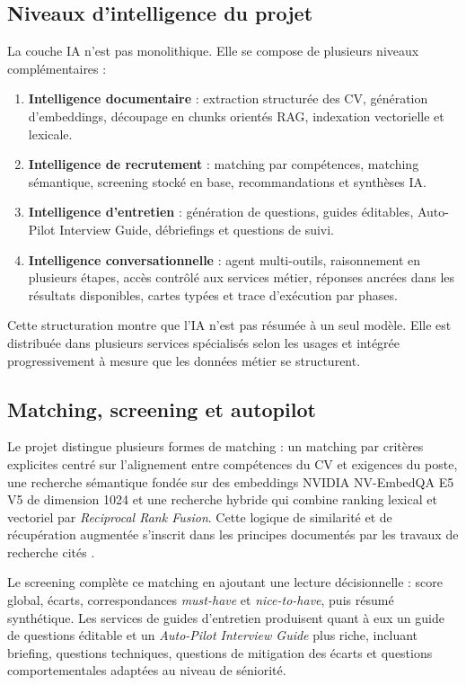 \subsection{Niveaux d'intelligence du projet}
La couche IA n'est pas monolithique. Elle se compose de plusieurs niveaux complémentaires :
\begin{enumerate}
  \item \textbf{Intelligence documentaire} : extraction structurée des CV, génération d'embeddings, découpage en chunks orientés RAG, indexation vectorielle et lexicale.
  \item \textbf{Intelligence de recrutement} : matching par compétences, matching sémantique, screening stocké en base, recommandations et synthèses IA.
  \item \textbf{Intelligence d'entretien} : génération de questions, guides éditables, Auto-Pilot Interview Guide, débriefings et questions de suivi.
  \item \textbf{Intelligence conversationnelle} : agent multi-outils, raisonnement en plusieurs étapes, accès contrôlé aux services métier, réponses ancrées dans les résultats disponibles, cartes typées et trace d'exécution par phases.
\end{enumerate}

Cette structuration montre que l'IA n'est pas résumée à un seul modèle. Elle est distribuée dans plusieurs services spécialisés selon les usages et intégrée progressivement à mesure que les données métier se structurent.

\subsection{Matching, screening et autopilot}
Le projet distingue plusieurs formes de matching : un matching par critères explicites centré sur l'alignement entre compétences du CV et exigences du poste, une recherche sémantique fondée sur des embeddings NVIDIA NV-EmbedQA E5 V5 de dimension 1024 et une recherche hybride qui combine ranking lexical et vectoriel par \textit{Reciprocal Rank Fusion}. Cette logique de similarité et de récupération augmentée s'inscrit dans les principes documentés par les travaux de recherche cités .

Le screening complète ce matching en ajoutant une lecture décisionnelle : score global, écarts, correspondances \textit{must-have} et \textit{nice-to-have}, puis résumé synthétique. Les services de guides d'entretien produisent quant à eux un guide de questions éditable et un \textit{Auto-Pilot Interview Guide} plus riche, incluant briefing, questions techniques, questions de mitigation des écarts et questions comportementales adaptées au niveau de séniorité.

